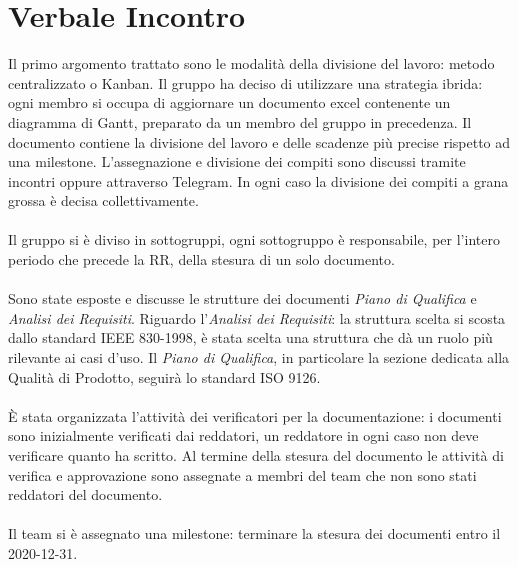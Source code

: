 \section{Verbale Incontro}
    Il primo argomento trattato sono le modalità della divisione del lavoro: metodo centralizzato o Kanban. Il gruppo ha deciso di utilizzare una strategia ibrida: ogni membro si occupa di aggiornare un documento excel contenente un diagramma di Gantt, preparato da un membro del gruppo in precedenza. Il documento contiene la divisione del lavoro e delle scadenze più precise rispetto ad una milestone. L'assegnazione e divisione dei compiti sono discussi tramite incontri oppure attraverso Telegram. In ogni caso la divisione dei compiti a grana grossa è decisa collettivamente.
    \\ \\
    \noindent Il gruppo si è diviso in sottogruppi, ogni sottogruppo è responsabile, per l'intero periodo che precede la RR, della stesura di un solo documento.
    \\ \\
    \noindent Sono state esposte e discusse le strutture dei documenti \textit{Piano di Qualifica} e \textit{Analisi dei Requisiti}. Riguardo l'\textit{Analisi dei Requisiti}: la struttura scelta si scosta dallo standard IEEE 830-1998, è stata scelta una struttura che dà un ruolo più rilevante ai casi d'uso. Il \textit{Piano di Qualifica}, in particolare la sezione dedicata alla Qualità di Prodotto, seguirà lo standard ISO 9126. 
    \\ \\
    \noindent È stata organizzata l'attività dei verificatori per la documentazione: i documenti sono inizialmente verificati dai reddatori, un reddatore in ogni caso non deve verificare quanto ha scritto. Al termine della stesura del documento le attività di verifica e approvazione sono assegnate a membri del team che non sono stati reddatori del documento.
    \\ \\
    \noindent Il team si è assegnato una milestone: terminare la stesura dei documenti entro il 2020-12-31.
